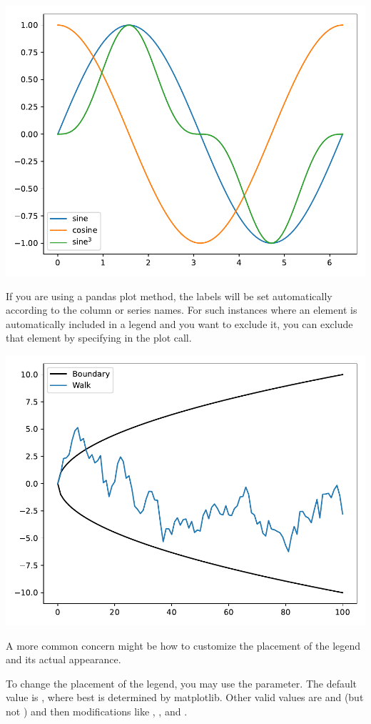 
\begin{center}
    \includegraphics[width = .7\textwidth]{figures/proseplots/legend-labels.pdf}
\end{center}

If you are using a pandas plot method, the labels will be set automatically according to the column or series names. For such instances where an element is automatically included in a legend and you want to exclude it, you can exclude that element by specifying  in the plot call.




\begin{center}
    \includegraphics[width = .7\textwidth]{figures/proseplots/pd-legend.pdf}
\end{center}


A more common concern might be how to customize the placement of the legend and its actual appearance. 

To change the placement of the legend, you may use the  parameter. The default value is , where best is determined by matplotlib. Other valid values are  and  (but not ) and then modifications like , , and . 

